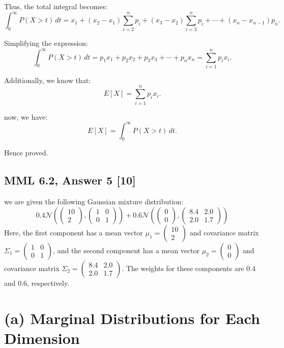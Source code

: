 \documentclass[12pt]{article}
\begin{document}
Thus, the total integral becomes:
\[
\int_0^\infty P(X > t) \, dt = x_1 + (x_2 - x_1) \sum_{i=2}^n p_i + (x_3 - x_2) \sum_{i=3}^n p_i + \cdots + (x_n - x_{n-1}) p_n.
\]

Simplifying the expression:
\[
\int_0^\infty P(X > t) \, dt = p_1 x_1 + p_2 x_2 + p_3 x_3 + \cdots + p_n x_n = \sum_{i=1}^n p_i x_i.
\]

Additionally, we know that:
\[
E[X] = \sum_{i=1}^n p_i x_i.
\]

now, we have:
\[
E[X] = \int_0^\infty P(X > t) \, dt.
\]

Hence proved.

\subsection*{MML 6.2, Answer 5 [10]}
we are given the following Gaussian mixture distribution:
\[
0.4 \mathcal{N}\left( \begin{pmatrix} 10 \\ 2 \end{pmatrix}, \begin{pmatrix} 1 & 0 \\ 0 & 1 \end{pmatrix} \right) + 0.6 \mathcal{N}\left( \begin{pmatrix} 0 \\ 0 \end{pmatrix}, \begin{pmatrix} 8.4 & 2.0 \\ 2.0 & 1.7 \end{pmatrix} \right)
\]
Here, the first component has a mean vector \( \mu_1 = \begin{pmatrix} 10 \\ 2 \end{pmatrix} \) and covariance matrix \( \Sigma_1 = \begin{pmatrix} 1 & 0 \\ 0 & 1 \end{pmatrix} \), and the second component has a mean vector \( \mu_2 = \begin{pmatrix} 0 \\ 0 \end{pmatrix} \) and covariance matrix \( \Sigma_2 = \begin{pmatrix} 8.4 & 2.0 \\ 2.0 & 1.7 \end{pmatrix} \). The weights for these components are 0.4 and 0.6, respectively.

\section*{(a) Marginal Distributions for Each Dimension}
\end{document}
